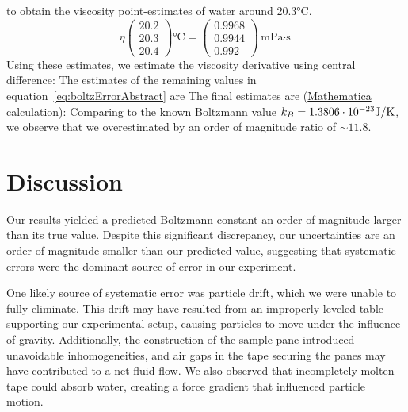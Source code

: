 \documentclass[aps,prb,twocolumn,superscriptaddress,floatfix,longbibliography,citeautoscript]{revtex4-2}
\begin{document}
to obtain the viscosity point-estimates of water around $20.3\si{\degreeCelsius}$. 
\[ 
    \eta
    \begin{pmatrix}
        20.2 \\ 20.3 \\ 20.4 
    \end{pmatrix} \si{\degreeCelsius} 
    = 
    \begin{pmatrix}
        0.9968 \\ 0.9944 \\ 0.992
    \end{pmatrix} \si{ \milli \pascal \cdot \second}
\] 
Using these estimates, we estimate the viscosity derivative using central difference: 
The estimates of the remaining values in equation~\ref{eq:boltzErrorAbstract} are 
The final estimates are (\href{https://www.wolframcloud.com/obj/nicholaslyu/Published/Notebok%20Calculations.nb}{Mathematica calculation)}: 
Comparing to the known Boltzmann value $k_B=1.3806\cdot 10^{-23}\mathrm{J/K}$, we observe that we overestimated by an order of magnitude ratio of $\sim 11.8$. 


\section{\label{sec:conclusion}Discussion}


Our results yielded a predicted Boltzmann constant an order of magnitude larger than its true value. Despite this significant discrepancy, our uncertainties are an order of magnitude smaller than our predicted value, suggesting that systematic errors were the dominant source of error in our experiment.

One likely source of systematic error was particle drift, which we were unable to fully eliminate. This drift may have resulted from an improperly leveled table supporting our experimental setup, causing particles to move under the influence of gravity. Additionally, the construction of the sample pane introduced unavoidable inhomogeneities, and air gaps in the tape securing the panes may have contributed to a net fluid flow. We also observed that incompletely molten tape could absorb water, creating a force gradient that influenced particle motion.
\end{document}
